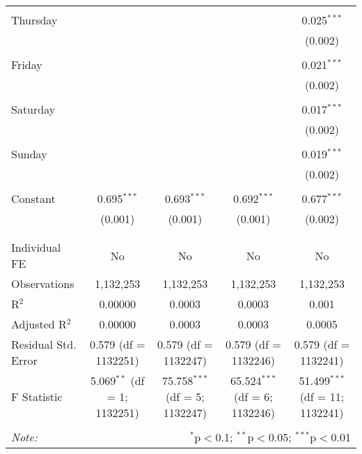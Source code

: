 \documentclass[
]{article}
\begin{document}
\begin{table}[!htbp]
{\begin{tabular}{@{\extracolsep{5pt}}lcccc}
  & & & & \\ 
 Thursday &  &  &  & 0.025$^{***}$ \\ 
  &  &  &  & (0.002) \\ 
  & & & & \\ 
 Friday &  &  &  & 0.021$^{***}$ \\ 
  &  &  &  & (0.002) \\ 
  & & & & \\ 
 Saturday &  &  &  & 0.017$^{***}$ \\ 
  &  &  &  & (0.002) \\ 
  & & & & \\ 
 Sunday &  &  &  & 0.019$^{***}$ \\ 
  &  &  &  & (0.002) \\ 
  & & & & \\ 
 Constant & 0.695$^{***}$ & 0.693$^{***}$ & 0.692$^{***}$ & 0.677$^{***}$ \\ 
  & (0.001) & (0.001) & (0.001) & (0.002) \\ 
  & & & & \\ 
\hline \\[-1.8ex] 
Individual FE & No & No & No & No \\ 
Observations & 1,132,253 & 1,132,253 & 1,132,253 & 1,132,253 \\ 
R$^{2}$ & 0.00000 & 0.0003 & 0.0003 & 0.001 \\ 
Adjusted R$^{2}$ & 0.00000 & 0.0003 & 0.0003 & 0.0005 \\ 
Residual Std. Error & 0.579 (df = 1132251) & 0.579 (df = 1132247) & 0.579 (df = 1132246) & 0.579 (df = 1132241) \\ 
F Statistic & 5.069$^{**}$ (df = 1; 1132251) & 75.758$^{***}$ (df = 5; 1132247) & 65.524$^{***}$ (df = 6; 1132246) & 51.499$^{***}$ (df = 11; 1132241) \\ 
\hline 
\hline \\[-1.8ex] 
\textit{Note:}  & \multicolumn{4}{r}{$^{*}$p$<$0.1; $^{**}$p$<$0.05; $^{***}$p$<$0.01} \\ 
\end{tabular}
} 
\end{table} 
\newpage
\end{document}
